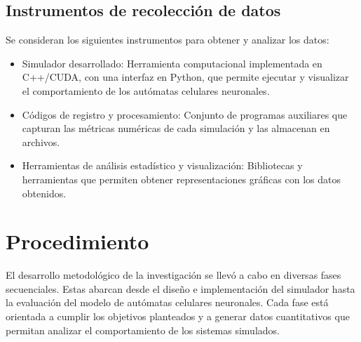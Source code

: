 \subsection{Instrumentos de recolección de datos}

Se consideran los siguientes instrumentos para obtener y analizar los datos:

\begin{itemize}
	
	\item Simulador desarrollado: Herramienta computacional implementada en C++/CUDA, con una interfaz en Python, que permite ejecutar y visualizar el comportamiento de los autómatas celulares neuronales.
	
	\item Códigos de registro y procesamiento: Conjunto de programas auxiliares que capturan las métricas numéricas de cada simulación y las almacenan en archivos.
	
	\item Herramientas de análisis estadístico y visualización: Bibliotecas y herramientas que permiten obtener representaciones gráficas con los datos obtenidos. 
	
\end{itemize}

\section{Procedimiento}

El desarrollo metodológico de la investigación se llevó a cabo en diversas fases secuenciales. Estas abarcan desde el diseño e implementación del simulador hasta la evaluación del modelo de autómatas celulares neuronales. Cada fase está orientada a cumplir los objetivos planteados y a generar datos cuantitativos que permitan analizar el comportamiento de los sistemas simulados.

